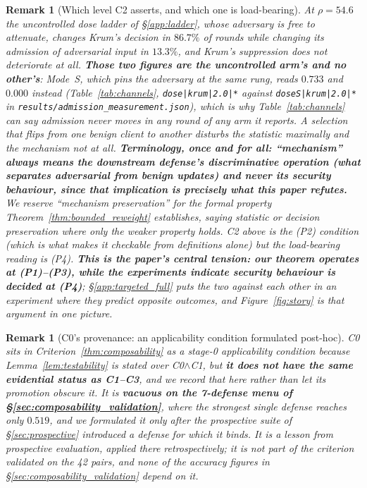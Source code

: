 \documentclass{article}
\newtheorem{remark}[theorem]{Remark}
\begin{document}
\begin{remark}[Which level C2 asserts, and which one is load-bearing]
\label{rem:levels}
At $\rho = 54.6$ the \emph{uncontrolled} dose ladder of §\ref{app:ladder}, whose adversary is free to attenuate, changes Krum's \emph{decision} in $86.7\%$ of rounds while changing its \emph{admission} of adversarial input in $13.3\%$, and Krum's suppression does not deteriorate at all. \textbf{Those two figures are the uncontrolled arm's and no other's}: Mode~S, which pins the adversary at the same rung, reads $0.733$ and $0.000$ instead (Table~\ref{tab:channels}, \texttt{dose|krum|2.0|*} against \texttt{doseS|krum|2.0|*} in \texttt{results/admission\_\allowbreak measurement.json}), which is why Table~\ref{tab:channels} can say admission never moves in any round of any arm it reports. A selection that flips from one benign client to another disturbs the statistic maximally and the mechanism not at all. \textbf{Terminology, once and for all: ``\emph{mechanism}'' always means the downstream defense's \emph{discriminative operation} (what separates adversarial from benign updates) and never its security behaviour, since that implication is precisely what this paper refutes.} We reserve ``mechanism preservation'' for the formal property Theorem~\ref{thm:bounded_reweight} establishes, saying \emph{statistic} or \emph{decision} preservation where only the weaker property holds. C2 above is the (P2) condition (which is what makes it checkable from definitions alone) but the load-bearing reading is (P4). \textbf{This is the paper's central tension: our theorem operates at (P1)--(P3), while the experiments indicate security behaviour is decided at (P4)}; §\ref{app:targeted_full} puts the two against each other in an experiment where they predict opposite outcomes, and Figure~\ref{fig:story} is that argument in one picture.
\end{remark}

\begin{remark}[C0's provenance: an applicability condition formulated post-hoc]
\label{rem:c0}
C0 sits in Criterion~\ref{thm:composability} as a stage-0 applicability condition because Lemma~\ref{lem:testability} is stated over C0$\wedge$C1, but \textbf{it does not have the same evidential status as C1--C3}, and we record that here rather than let its promotion obscure it. It is \textbf{vacuous on the 7-defense menu of §\ref{sec:composability_validation}}, where the strongest single defense reaches only $0.519$, and we formulated it only after the prospective suite of §\ref{sec:prospective} introduced a defense for which it binds. It is a lesson from prospective evaluation, applied there retrospectively; it is \emph{not} part of the criterion validated on the 42 pairs, and none of the accuracy figures in §\ref{sec:composability_validation} depend on it.
\end{remark}
\end{document}
